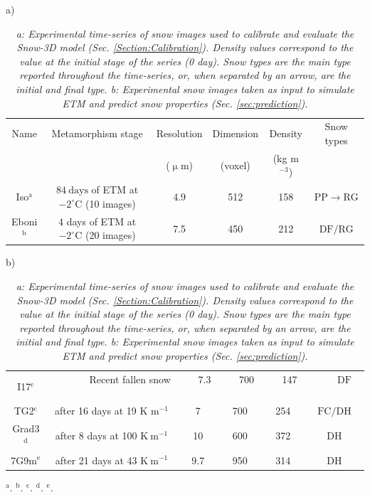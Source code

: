 \documentclass[draft,ms]{agujournal2019}
\begin{document}
\begin{table}
\caption{\textit{a: Experimental time-series of snow images used to calibrate and evaluate the Snow-3D model (Sec. \ref{Section:Calibration}). Density values correspond to the value at the initial stage of the series (0 day). Snow types are the main type reported throughout the time-series, or, when separated by an arrow, are the initial and final type. b: Experimental snow images taken as input to simulate ETM and predict snow properties (Sec. \ref{sec:prediction}).}}
a)\\
\begin{tabular}{|c|c|c|c|c|c|}
\hline Name & Metamorphism stage & Resolution & Dimension & Density & Snow types \\
 &  & ($\upmu$m) &(voxel) & (kg m$^{-3}$) &  \\
\hline 
Iso$^\mathrm{a}$ & $84\ \mathrm{days}$ of ETM at $-2^{\circ} \mathrm{C}$ (10 images) & 4.9 & 512 & 158 & \small{$\mathrm{PP} \rightarrow \mathrm{RG}$}\\
Eboni$^\mathrm{b}$ & 4 days of ETM at $-2^{\circ} \mathrm{C}$ (20 images) & 7.5 & 450 & 212 & \small{$\mathrm{DF/RG}$}\\
\hline 
\end{tabular}
b)\\
\begin{tabular}{|c|c|c|c|c|c|}
\hline 
I17$^\mathrm{c}$ &$\quad$ $\qquad$  Recent fallen snow $\qquad$ $\qquad$ &$\quad$ 7.3 $\quad$&$\quad$ 700 $\quad$&$\quad$ 147 $\quad$& $\qquad$\small{$\mathrm{DF}$} $\qquad$\\
TG2$^\mathrm{c}$ & after 16 days at 19 K m$^{-1}$ & 7 & 700 & 254 & \small{$\mathrm{FC} / \mathrm{DH}$} \\
Grad3$^\mathrm{d}$ & after 8 days at 100 $\mathrm{K}\ \mathrm{m}^{-1}$ & 10 & 600 & 372 & \small{$\mathrm{DH}$} \\
7G9m$^\mathrm{e}$ & after 21 days at 43 $\mathrm{K}\ \mathrm{m}^{-1}$ & 9.7 & 950 & 314 & \small{$\mathrm{DH}$} \\
\hline
\end{tabular}
\label{tab:series}
$^\mathrm{a}$\protect{}. $^\mathrm{b}$\protect{}.
$^\mathrm{c}$\protect{}.  $^\mathrm{d}$\protect{}. $^\mathrm{e}$\protect{}.
\end{table}
\end{document}
